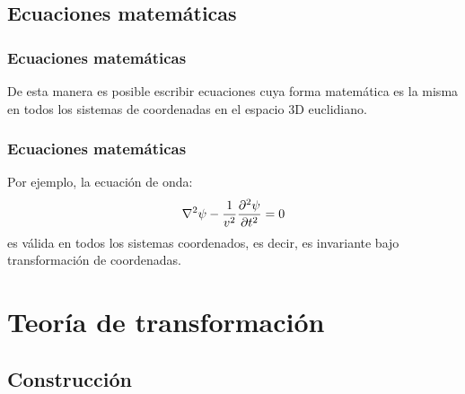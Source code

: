 \documentclass[12pt]{beamer}
\begin{document}
\subsection*{Ecuaciones matemáticas}

\begin{frame}
\frametitle{Ecuaciones matemáticas}
De esta manera es posible escribir ecuaciones cuya forma matemática es la misma en todos los sistemas de coordenadas en el espacio 3D euclidiano.
\end{frame}
\begin{frame}
\frametitle{Ecuaciones matemáticas}
Por ejemplo, la ecuación de onda:
\begin{align*}
\laplacian{\psi} - \dfrac{1}{v^{2}} \pdv[2]{\psi}{t} = 0
\end{align*}
es válida en todos los sistemas coordenados, es decir, es invariante bajo transformación de coordenadas.
\end{frame}

\section{Teoría de transformación}
\subsection{Construcción}
\end{document}
